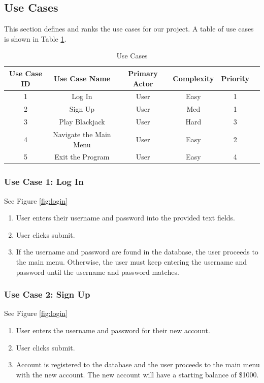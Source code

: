 \documentclass[10pt,conference,onecolumn,compsoc]{IEEEtran}
\begin{document}
\subsection{Use Cases}
This section defines and ranks the use cases for our project. A table of use cases is shown in Table \ref{tab:useCaseIndex}.

\begin{table}
\centering
\begin{tabular}{|c|c|c|c|c|c|}
\hline
Use Case ID & Use Case Name & Primary Actor & Complexity & Priority \\
\hline \hline
1 & Log In & User & Easy & 1\\
\hline
2 & Sign Up & User & Med & 1\\
\hline
3 & Play Blackjack & User & Hard & 3\\
\hline
4 & Navigate the Main Menu & User & Easy & 2\\
\hline
5 & Exit the Program & User & Easy & 4\\
\hline
\end{tabular}
\caption{Use Cases}
\label{tab:useCaseIndex}
\end{table}

\subsubsection{Use Case 1: Log In}
See Figure \ref{fig:login}
\begin{enumerate}
\item User enters their username and password into the provided text fields.
\item User clicks submit.
\item If the username and password are found in the database, the user proceeds to the main menu. Otherwise, the user must keep entering the username and password until the username and password matches.
\end{enumerate}

\subsubsection{Use Case 2: Sign Up}
See Figure \ref{fig:login}
\begin{enumerate}
\item User enters the username and password for their new account.
\item User clicks submit.
\item Account is registered to the database and the user proceeds to the main menu with the new account. The new account will have a starting balance of \$1000.
\end{enumerate}
\end{document}
